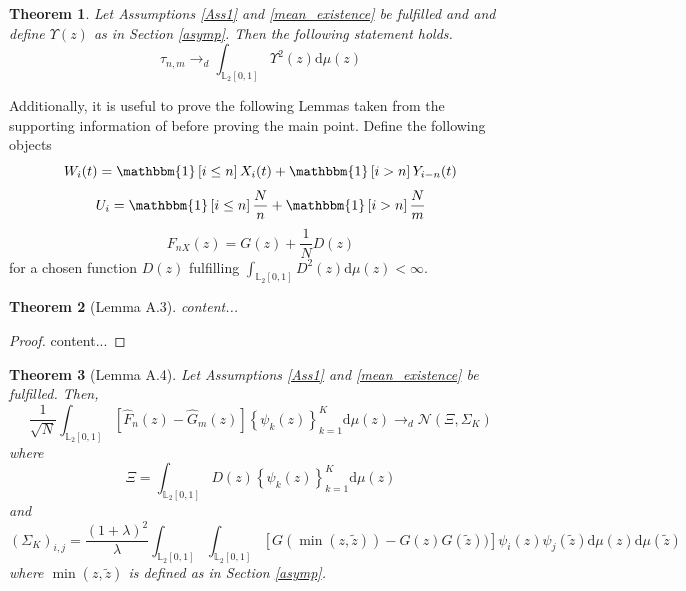\documentclass[12pt, a4paper]{article}
\theoremstyle{MAstyle} \newtheorem{assumption}{Assumption}[section]
\theoremstyle{MAstyle} \newtheorem{definition}{Definition}[section]
\theoremstyle{MAstyle} \newtheorem{theorem}{Theorem}[section]
\begin{document}
			\begin{theorem}\label{asymp_proof}
				Let Assumptions \ref{Ass1} and \ref{mean_existence} be fulfilled and  and define $\Upsilon(z)$ as in Section \ref{asymp}. Then the following statement holds.
				\begin{equation}
					\tau_{n,m} \rightarrow_d \int_{\mathbb{L}_2[0,1]}\Upsilon^2(z) \mathrm{d}\mu(z)
				\end{equation}
			\end{theorem}
			
			\newpage
			Additionally, it is useful to prove the following Lemmas taken from the supporting information of \cite{bugni_permutation_2021} before proving the main point.
			Define the following objects
				\begin{equation}
					W_i(t) = \mathbbm{1}\left[i \leq n\right] X_i(t) + \mathbbm{1}\left[i > n\right] Y_{i-n}(t)
				\end{equation}
				\begin{equation}
					U_i = \mathbbm{1}\left[i \leq n\right] \frac{N}{n} + \mathbbm{1}\left[i > n\right] \frac{N}{m}
				\end{equation}
				\begin{equation}
					F_{nX}(z) = G(z) + \frac{1}{N}D(z)
				\end{equation}
				for a chosen function $D(z)$ fulfilling $\int_{\mathbb{L}_2[0,1]}D^2(z) \mathrm{d} \mu(z) < \infty$.
			
			\begin{theorem}[Lemma A.3]
				content...
			\end{theorem}
		
			\begin{proof}
				content...
			\end{proof}
		
			\begin{theorem}[Lemma A.4]
				Let Assumptions \ref{Ass1} and \ref{mean_existence} be fulfilled. Then, 
				\begin{equation}
					\frac{1}{\sqrt{N}} \int_{\mathbb{L}_2[0,1]} \left[ \hat{F}_n(z) - \hat{G}_{m}(z) \right] \left\{\psi_k(z)\right\}_{k = 1}^K \mathrm{d}\mu(z)\rightarrow_d \mathcal{N}(\Xi, \Sigma_K)
				\end{equation}
				where 
				\begin{equation}
					\Xi = \int_{\mathbb{L}_2[0,1]}D(z) \left\{\psi_k(z)\right\}_{k = 1}^K \mathrm{d}\mu(z)
				\end{equation}
				and 
				\begin{equation}
					\left(\Sigma_K\right)_{i,j} = \frac{(1 + \lambda)^2}{\lambda} \int_{\mathbb{L}_2[0,1]}\int_{\mathbb{L}_2[0,1]} \left[G(\min(z, 	\tilde{z})) - G(z)G(\tilde{z}))\right] \psi_i(z) \psi_j(\tilde{z}) \mathrm{d}\mu(z) \mathrm{d}\mu(\tilde{z})
				\end{equation}
				where $\min(z, \tilde{z})$ is defined as in Section \ref{asymp}.
			\end{theorem}
		
\end{document}

